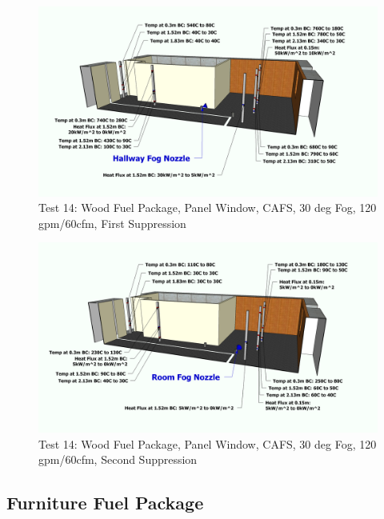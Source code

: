 \documentclass[12pt,oneside]{book}
\begin{document}
\begin{figure}[!ht]
	\includegraphics[width=6in]{../Figures/Pictures/Metric/DelCoFogTest14FirstSuppression}
	\caption{Test 14: Wood Fuel Package, Panel Window, CAFS, 30 deg Fog, 120 gpm/60cfm, First Suppression}
	\label{fig:Test_14_First_Suppression}
\end{figure}

\begin{figure}[!ht]
	\includegraphics[width=6in]{../Figures/Pictures/Metric/DelCoFogTest14SecondSuppression}
	\caption{Test 14: Wood Fuel Package, Panel Window, CAFS, 30 deg Fog, 120 gpm/60cfm, Second Suppression}
	\label{fig:Test_14_Second_Suppression}
\end{figure}

\subsection{Furniture Fuel Package}
\label{subsec:Furniture_Fuel_Package}
\end{document}
